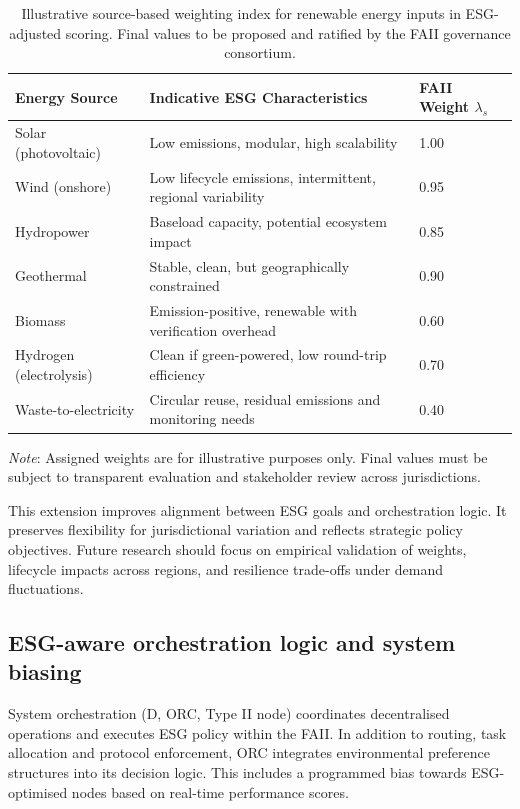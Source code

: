 \documentclass[oneside,10pt]{swissi}
\begin{document}
\begin{table}[h!]
\centering
\small
\renewcommand{\arraystretch}{1.2}
\begin{tabularx}{\textwidth}{p{3.8cm} X p{2.2cm}}
\hline
\textbf{Energy Source} & \textbf{Indicative ESG Characteristics} & \textbf{FAII Weight \( \lambda_s \)} \\
\hline
Solar (photovoltaic) & Low emissions, modular, high scalability & 1.00 \\
Wind (onshore) & Low lifecycle emissions, intermittent, regional variability & 0.95 \\
Hydropower & Baseload capacity, potential ecosystem impact & 0.85 \\
Geothermal & Stable, clean, but geographically constrained & 0.90 \\
Biomass & Emission-positive, renewable with verification overhead & 0.60 \\
Hydrogen (electrolysis) & Clean if green-powered, low round-trip efficiency & 0.70 \\
Waste-to-electricity & Circular reuse, residual emissions and monitoring needs & 0.40 \\
\hline
\end{tabularx}
\caption{Illustrative source-based weighting index for renewable energy inputs in ESG-adjusted scoring. Final values to be proposed and ratified by the FAII governance consortium.}
\label{tab:esg-energy-sources}
\vspace{1ex}
\begin{minipage}{0.94\textwidth}
\small
\textit{Note}: Assigned weights are for illustrative purposes only. Final values must be subject to transparent evaluation and stakeholder review across jurisdictions.
\end{minipage}
\end{table}

This extension improves alignment between ESG goals and orchestration logic. It preserves flexibility for jurisdictional variation and reflects strategic policy objectives. Future research should focus on empirical validation of weights, lifecycle impacts across regions, and resilience trade-offs under demand fluctuations.\\

\subsection{ESG-aware orchestration logic and system biasing}

System orchestration (D, ORC, Type II node) coordinates decentralised operations and executes ESG policy within the FAII. In addition to routing, task allocation and protocol enforcement, ORC integrates environmental preference structures into its decision logic. This includes a programmed bias towards ESG-optimised nodes based on real-time performance scores.
\end{document}

